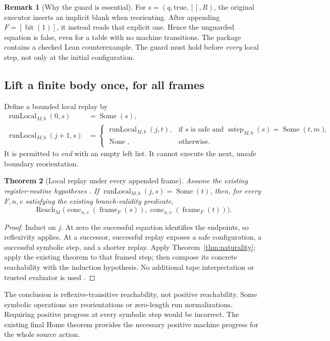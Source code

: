 \documentclass[11pt,letterpaper]{article}
\newtheorem{theorem}{Theorem}[section]
\theoremstyle{definition}
\newtheorem{remark}[theorem]{Remark}
\newcommand{\code}[1]{\texttt{\detokenize{#1}}}
\newcommand{\conc}{\operatorname{conc}}
\newcommand{\frameop}{\operatorname{frame}}
\newcommand{\sstep}{\operatorname{sstep}}
\newcommand{\Reach}{\operatorname{Reach}}
\newcommand{\Some}{\operatorname{Some}}
\newcommand{\None}{\operatorname{None}}
\newcommand{\runlocal}{\operatorname{runLocal}}
\begin{document}
\begin{remark}[Why the guard is essential]
For $s=(q,\mathrm{true},[],R)$, the original executor inserts an implicit blank
when reorienting. After appending $F=[\operatorname{bit}(1)]$, it instead reads
that explicit one. Hence the unguarded equation is false, even for a table
with no machine transitions. The package contains a checked Lean
counterexample. The guard must hold before \emph{every} local step, not only
at the initial configuration.
\end{remark}

\subsection{Lift a finite body once, for all frames}

Define a bounded local replay by
\[
\begin{split}
 \runlocal_{M,b}(0,s)&=\Some(s),\\
 \runlocal_{M,b}(j+1,s)&=
 \begin{cases}
 \runlocal_{M,b}(j,t),&\text{if $s$ is safe and $\sstep_{M,b}(s)=\Some(t,m)$},\\
 \None,&\text{otherwise}.
 \end{cases}
\end{split}
\]
It is permitted to \emph{end} with an empty left list. It cannot execute the
next, unsafe boundary reorientation.

\begin{theorem}[Local replay under every appended frame]
\label{thm:runlocal}
Assume the existing register-routine hypotheses \code{BoxLemmas M}. If
$\runlocal_{M,b}(j,s)=\Some(t)$, then, for every $F,n,v$ satisfying the existing
branch-validity predicate,
\[
 \Reach_M\bigl(\conc_{n,v}(\frameop_F(s)),
              \conc_{n,v}(\frameop_F(t))\bigr).
\]
\end{theorem}

\begin{proof}
Induct on $j$. At zero the successful equation identifies the endpoints, so
reflexivity applies. At a successor, successful replay exposes a safe
configuration, a successful symbolic step, and a shorter replay. Apply
Theorem~\ref{thm:naturality}; apply the existing \code{sstep_sound} theorem to
that framed step; then compose its concrete reachability with the induction
hypothesis. No additional tape interpretation or trusted evaluator is used
\cite{runtime}.
\end{proof}

The conclusion is reflexive-transitive reachability, not positive
reachability. Some symbolic operations are reorientations or zero-length run
normalizations. Requiring positive progress at every symbolic step would be
incorrect. The existing final Home theorem provides the necessary positive
machine progress for the whole source action.
\end{document}
